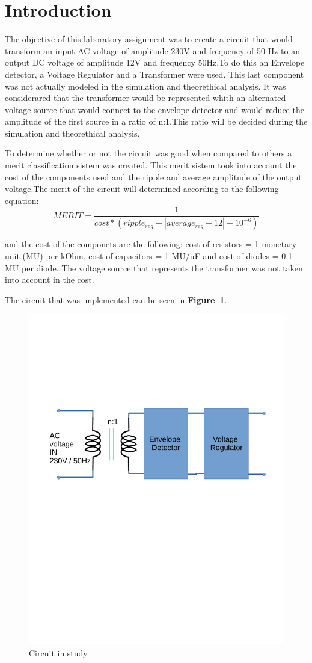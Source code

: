 \section{Introduction}
\label{sec:introduction}


\par The objective of this laboratory assignment was to create a circuit that would transform an input AC voltage of amplitude 230V and frequency of 50 Hz to an output DC voltage of amplitude 12V and frequency 50Hz.To do this an Envelope detector, a Voltage Regulator and a Transformer were used. This last component was not actually modeled in the simulation and theorethical analysis. It was considerared that the transformer would be represented whith an alternated voltage source that would connect to the envelope detector and would reduce the amplitude of the first source in a ratio of n:1.This ratio will be decided during the simulation and theorethical analysis.\par
To determine whether or not the circuit was good when compared to others a merit classification sistem was created. This merit sistem took into account the cost of the components used and the ripple and average amplitude of the output voltage.The merit of the circuit will determined according to the following equation: 
\begin {equation}
	 MERIT = \frac{1}{cost*(ripple_{reg} + |average_{reg} - 12| + 10^{-6})}   	
	\label{eq:i1}
\end{equation}

and the cost of the componets are the following: cost of resistors = 1 monetary unit (MU) per kOhm, cost of capacitors = 1 MU/uF
and cost of diodes = 0.1 MU per diode. The voltage source that represents the transformer was not taken into account in the cost. 
 
The circuit that was implemented can be seen in \textbf{Figure~\ref{fig:circuit_t3}}.\par
\begin{figure}[h] \centering
\includegraphics[width=0.6\linewidth]{circuit_t3.pdf}
\vspace{-6cm}
\caption{Circuit in study}
\label{fig:circuit_t3}
\end{figure}


